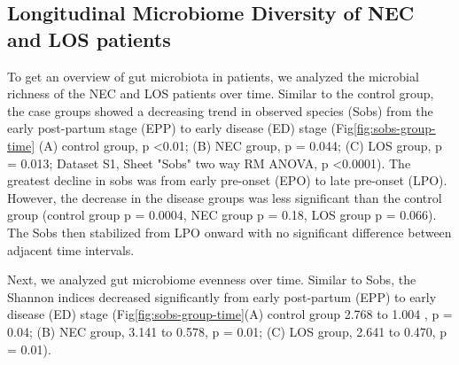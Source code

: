 \documentclass[fleqn,10pt, lineno]{wlpeerj} %
\begin{document}
   \subsection*{Longitudinal Microbiome Diversity of NEC and LOS patients}
    To get an overview of gut microbiota in patients, we analyzed the microbial richness of the NEC and LOS patients over time.  Similar to the control group, the case groups showed a decreasing trend in observed species (Sobs) from the early post-partum stage (EPP) to early disease (ED) stage (Fig\ref{fig:sobs-group-time} (A) control group, p \textless 0.01; (B) NEC group, p = 0.044; (C) LOS group, p = 0.013; Dataset S1, Sheet "Sobs" two way RM ANOVA, p \textless 0.0001).  The greatest decline in sobs was from early pre-onset (EPO) to late pre-onset (LPO). However, the decrease in the disease groups was less significant than the control group (control group p = 0.0004, NEC group p = 0.18, LOS group p = 0.066). The Sobs then stabilized from LPO onward with no significant difference between adjacent time intervals.


    Next, we analyzed gut microbiome evenness over time. Similar to Sobs, the Shannon indices decreased significantly from early post-partum (EPP) to early disease (ED) stage (Fig\ref{fig:sobs-group-time}(A) control group 2.768 to 1.004 , p = 0.04; (B) NEC group, 3.141 to 0.578, p = 0.01; (C) LOS group, 2.641 to 0.470, p = 0.01).

\end{document}
